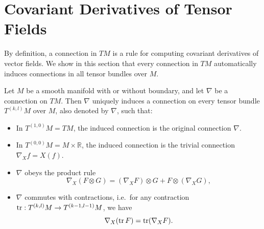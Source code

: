 \documentclass[../main.tex]{subfiles}
\begin{document}
\section{Covariant Derivatives of Tensor Fields}
By definition, a connection in $TM$ is a rule for computing covariant derivatives of vector fields. We show in this section that every connection in $TM$ automatically induces connections in all tensor bundles over $M$.

\begin{proposition}{}{}
	Let $M$ be a smooth manifold with or without boundary, and let $\nabla$ be a connection on $TM$. Then $\nabla$ uniquely induces a connection on every tensor bundle $T^{(k, l)} M$ over $M$, also denoted by $\nabla$, such that:
	\begin{itemize}
		\item In $T^{(1, 0)} M = TM$, the induced connection is the original connection $\nabla$.
		\item In $T^{(0, 0)} M = M \times \mathbb{R}$, the induced connection is the trivial connection $\nabla_X f = X(f)$.
		\item $\nabla$ obeys the product rule
		      \begin{equation}
			      \nabla_X (F \otimes G) = (\nabla_X F) \otimes G + F \otimes (\nabla_X G),
		      \end{equation}
		\item $\nabla$ commutes with contractions, i.e.\ for any contraction $\operatorname{tr}: T^{(k, l)} M \to T^{(k-1, l-1)} M$, we have
		      \begin{equation}
			      \nabla_X (\operatorname{tr} F) = \operatorname{tr} (\nabla_X F).
		      \end{equation}
	\end{itemize}


\end{proposition}
\end{document}
